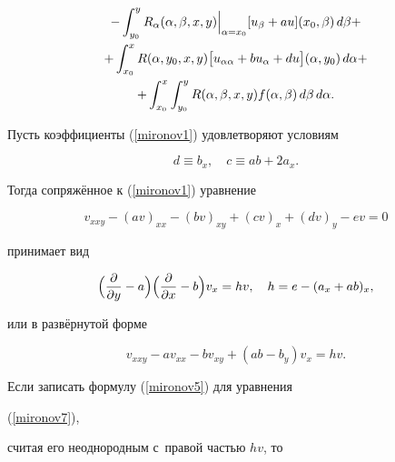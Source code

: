 \begin{multline}


-\int_{y_{0}}^{y} R_{\alpha}(\alpha,\beta,x,y)


\Bigl\vert_{\alpha=x_{0}}\Bigr. [u_{\beta}+au](x_{0},\beta)\,d\beta+\\


+\int_{x_{0}}^{x} R(\alpha,y_{0},x,y)


\bigl[u_{\alpha\alpha}+bu_{\alpha}+du\bigr](\alpha,y_{0})\,d\alpha +\\


+\int_{x_{0}}^{x}  \int_{y_{0}}^{y}


R(\alpha,\beta,x,y)f(\alpha,\beta) \,d\beta \,d\alpha.\label{mironov5}


\end{multline}





Пусть коэффициенты (\ref{mironov1}) удовлетворяют условиям


\begin{equation}\label{mironov6}


d\equiv b_{x},\quad c\equiv ab+2a_{x}.


\end{equation}


Тогда сопряжённое к (\ref{mironov1}) уравнение


$$


v_{xxy}-(av)_{xx}-(bv)_{xy}+(cv)_{x}+(dv)_{y}-ev=0


$$


принимает вид


\begin{equation}\label{mironov7}


\Bigl ( \frac{\partial}{\partial y}-a \Bigr )


\Bigl ( \frac{\partial}{\partial x}-b \Bigr )v_{x} = hv,


\quad h=e-(a_{x}+ab)_{x},


\end{equation}


или в развёрнутой форме


$$


v_{xxy}-av_{xx}-bv_{xy}+(ab-b_{y})v_{x}=hv.


$$


Если записать формулу (\ref{mironov5}) для уравнения


(\ref{mironov7}),


считая его неоднородным с~правой частью $hv$, то


